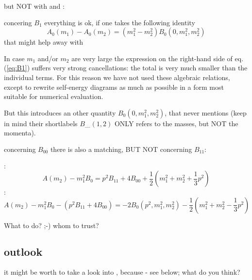\documentclass[
  english,		%
  a4paper,		%
  11pt,			%
  DIV=12,		%
  titlepage,
  toc=bibnumbered,
  parskip=full,  	%
  headings=normal,
  BCOR=12mm,
  numbers=noenddot
]{scrartcl}
\begin{document}
but NOT with \cite{Passarino:1978jh} and \LoopTools:

concering $B_1$ everything is ok, if one takes the following identity
\begin{equation}
A_0(m_1)-A_0(m_2)=(m_1^2-m_2^2)B_0(0,m_1^2,m_2^2)
\end{equation}
that might help away with
\begin{displayquote}
In case $m_1$ and/or $m_2$ are very large the expression on the right-hand side of eq. (\ref{eq:B1}) suffers very strong cancellations: the total is very much smaller than the individual terms. For this reason we have not used these algebraic relations, except to rewrite self-energy diagrams as much as possible in a form most suitable for numerical evaluation.
\end{displayquote}
But this introduces an other quantity $B_0(0,m_1^2,m_2^2)$, that \cite{Bojak:2000eu,Ellis:2011cr} never mentions (keep in mind their shortlabels $B_{....}(1,2)$ ONLY refers to the masses, but NOT the momenta).

concerning $B_{00}$ there is also a matching, BUT NOT concerning $B_{11}$:

\cite{Passarino:1978jh}:
\begin{equation}
A(m_2)-m_1^2B_0 = p^2B_{11}+4B_{00}+\frac 1 2\left(m_1^2+m_2^2+\frac 1 3p^2\right)
\end{equation}
\LoopTools:
\begin{equation}
A(m_2)-m_1^2B_0 - (p^2B_{11}+4B_{00}) =-2B_0(p^2,m_1^2,m_2^2)-\frac 1 2\left(m_1^2+m_2^2-\frac 1 3p^2\right)
\end{equation}

What to do? ;-) whom to trust?

\subsection{outlook}
it might be worth to take a look into \cite{Ellis:2011cr}, because - see below; what do you think?


\newpage
\appendix


\listoffixmes
\end{document}
